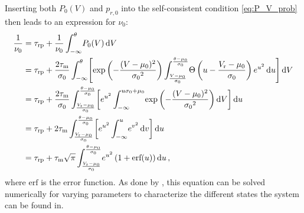 Inserting both $P_0(V)$ and $p_{r, 0}$ into the self-consistent condition \eqref{eq:P_V_prob}
then leads to an expression for $\nu_0$:
\begin{equation}
    \begin{split}
        \frac{1}{\nu_0} 	
            &= \tau_\text{rp} + \frac{1}{\nu_0} \int_{-\infty}^{\theta} \! P_0(V) \diff V  \\ 
            &= \tau_\text{rp} + \frac{2 \tau_\text{m}}{\sigma_0} 
                \int_{-\infty}^{\theta} \! \left[ 
                    \exp{\left(- \frac{(V - \mu_0)^2}{{\sigma_0}^2} \right)}
                    \int_{\frac{V - \mu_0}{\sigma_0}}^{\frac{\theta - \mu_0}{\sigma_0}} \! 
                        \Theta \left(u - \frac{V_\text{r} - \mu_0}{\sigma_0} \right) e^{u^2} \diff u 
                    \right] \diff V  \\ 
            &= \tau_\text{rp} + \frac{2 \tau_\text{m}}{\sigma_0} 
                \int_{\frac{V_\text{r} - \mu_0}{\sigma_0}}^{\frac{\theta - \mu_0}{\sigma_0}} \! 
                    \left[ 
                        e^{u^2}
                        \int_{-\infty}^{u \sigma_0 + \mu_0} \! 
                        \exp{\left(- \frac{(V - \mu_0)^2}{{\sigma_0}^2} \right)}
                        \diff V
                    \right] \diff u  \\ 
            &= \tau_\text{rp} + 2 \tau_\text{m}
                \int_{\frac{V_\text{r} - \mu_0}{\sigma_0}}^{\frac{\theta - \mu_0}{\sigma_0}} \! 
                    \left[ 
                        e^{u^2}
                        \int_{-\infty}^{u} \! e^{v^2} \diff v
                    \right] \diff u  \\ 
            &= \tau_\text{rp} + \tau_\text{m} \sqrt{\pi}
                \int_{\frac{V_\text{r} - \mu_0}{\sigma_0}}^{\frac{\theta - \mu_0}{\sigma_0}} \! 
                e^{u^2} \left(1 + \text{erf}(u)\right)
                \diff u  \,,
        \label{eq:self_consistency}
    \end{split}
\end{equation}
where $\text{erf}$ is the error function. 
As done by , this equation can be solved numerically for varying parameters to 
characterize the different states the system can be found in.

